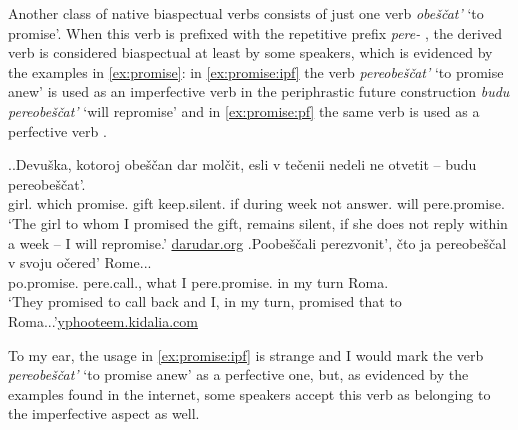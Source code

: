 Another class of native biaspectual verbs   consists of just one verb \textit{obe\v{s}\v{c}at'} `to promise'. When this verb is prefixed with the repetitive  prefix \textit{pere-}  , the derived verb is considered biaspectual at least by some speakers, which is evidenced by the examples in \ref{ex:promise}: in \ref{ex:promise:ipf} the verb \textit{pereobe\v{s}\v{c}at'} `to promise anew' is used as an imperfective verb  in the periphrastic future  construction \textit{budu pereobe\v{s}\v{c}at'} `will repromise' and in \ref{ex:promise:pf} the same verb is used as a perfective verb . 

\ex.\label{ex:promise}\ag.\label{ex:promise:ipf}Devu\v{s}ka, kotoroj obe\v{s}\v{c}an dar mol\v{c}it, esli {v te\v{c}enii} nedeli ne otvetit -- budu pereobe\v{s}\v{c}at'.\\
girl. which promise. gift keep.silent. if during week not answer. {}  will pere.promise.\\
\trans `The girl to whom I promised the gift, remains silent, if she does not reply within a week -- I will repromise.'
\hbox{}\hfill\hbox{\url{darudar.org}}
\bg.\label{ex:promise:pf}Poobe\v{s}\v{c}ali perezvonit', \v{c}to ja pereobe\v{s}\v{c}al v svoju o\v{c}ered' Rome...\\
po.promise. pere.call., what I pere.promise. in my turn Roma.\\
\trans `They promised to call back and I, in my turn, promised that to Roma...'\hbox{}\hfill\hbox{\url{yphooteem.kidalia.com}}

To my ear, the usage in \ref{ex:promise:ipf} is strange and I would mark the verb \textit{pereobe\v{s}\v{c}at'} `to promise anew' as a perfective one, but, as evidenced by the examples found in the internet, some speakers accept this verb as belonging to the imperfective aspect as well.

